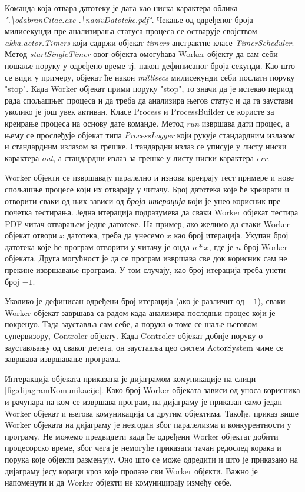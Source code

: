 \documentclass[12pt,oneside]{memoir}
\begin{document}
Команда која отвара датотеку је дата као ниска карактера облика \textit{".\textbackslash odabranCitac.exe .\textbackslash nazivDatoteke.pdf"}. Чекање од одређеног броја милисекунди пре анализирања статуса процеса се остварује својством \textit{akka.actor.Timers} који садржи објекат \textit{timers} апстрактне класе \textit{TimerScheduler}. Метод \textit{startSingleTimer} овог објекта омогућава Worker објекту да сам себи пошаље поруку у одређено време тј. након дефинисаног броја секунди. Као што се види у примеру, објекат ће након \textit{millisecs} милисекунди себи послати поруку "stop". Када Worker објекат прими поруку "stop", то значи да је истекао период рада спољашњег процеса и да треба да анализира његов статус и да га заустави уколико је још увек активан. Класе Process и ProcessBuilder се користе за креирање процеса на основу дате команде. Метод \textit{run} извршава дати процес, а њему се прослеђује објекат типа \textit{ProcessLogger} који рукује стандардним излазом и стандардним излазом за грешке. Стандардни излаз се уписује у листу ниски карактера \textit{out}, а стандардни излаз за грешке у листу ниски карактера \textit{err}.

Worker објекти се извршавају паралелно и изнова креирају тест примере и нове спољашње процесе који их отварају у читачу. Број датотека које ће креирати и отворити сваки од њих зависи од \textit{броја итерација} који је унео корисник пре почетка тестирања. Једна итерација подразумева да сваки Worker објекат тестира PDF читач отварањем једне датотеке. На пример, ако желимо да сваки Worker објекат отвори $x$ датотека, треба да унесемо $x$ као број итерација. Укупан број датотека које ће програм отворити у читачу је онда $n*x$, где је $n$ број Worker објеката. Друга могућност је да се програм извршава све док корисник сам не прекине извршавање програма. У том случају, као број итерација треба унети број $-1$.

Уколико је дефинисан одређени број итерација (ако је различит од $-1$), сваки Worker објекат завршава са радом када анализира последњи процес који је покренуо. Тада зауставља сам себе, а порука о томе се шаље његовом супервизору, Controler објекту. Када Controler објекат добије поруку о заустављању од сваког детета, он зауставља цео систем ActorSystem чиме се завршава извршавање програма.

Интеракција објеката приказана је дијаграмом комуникације на слици \ref{fig:dijagramKomunikacije}. Како број Worker објеката зависи од уноса корисника и рачунара на ком се извршава програм, на дијаграму је приказан само један Worker објекат и његова комуникација са другим објектима. Такође, приказ више Worker објеката на дијаграму је незгодан због паралелизма и конкурентности у програму. Не можемо предвидети када ће одређени Worker објектат добити процесорско време, због чега је немогуће приказати тачан редослед корака и порука које објекти размењују. Оно што се може одредити и што је приказано на дијаграму јесу кораци кроз које пролазе сви Worker објекти. Важно је напоменути и да Worker објекти не комуницирају између себе.  
\end{document}
